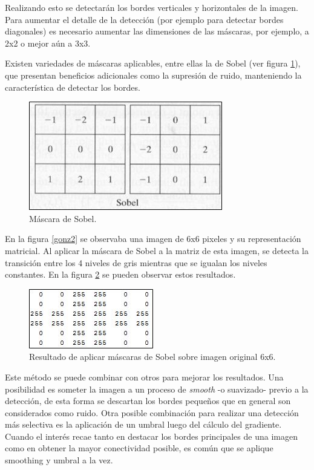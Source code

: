 Realizando esto se detectarán los bordes verticales y horizontales de la imagen. Para aumentar el detalle de la detección (por ejemplo para detectar bordes diagonales) es necesario aumentar las dimensiones de las máscaras, por ejemplo, a 2x2 o mejor aún a 3x3.

Existen variedades de máscaras aplicables, entre ellas la de Sobel (ver figura \ref{gonz5}), que presentan beneficios adicionales como la supresión de ruido, manteniendo la característica de detectar los bordes.

\begin{figure}[H]
\begin{center}
\includegraphics[scale=0.8]{img/08_matriz_sobel.jpg}
\end{center}
\caption{Máscara de Sobel.}
\label{gonz5}
\end{figure}

En la figura \ref{gonz2} se observaba una imagen de 6x6 pixeles y su representación matricial. Al aplicar la máscara de Sobel a la matriz de esta imagen, se detecta la transición entre los 4 niveles de gris mientras que se igualan los niveles constantes. En la figura \ref{gonz6} se pueden observar estos resultados.

\begin{figure}[H]
\begin{center}
\includegraphics[scale=0.8]{img/09_escala_grises_deteccion_borde.jpg}
\end{center}
\caption{Resultado de aplicar máscaras de Sobel sobre imagen original 6x6.}
\label{gonz6}
\end{figure}

 Este método se puede combinar con otros para mejorar los resultados. Una posibilidad es someter la imagen a un proceso de \textit{smooth}\cite{smooth} -o suavizado- previo a la detección, de esta forma se descartan los bordes pequeños que en general son considerados como ruido. Otra posible combinación para realizar una detección más selectiva es la aplicación de un umbral luego del cálculo del gradiente. Cuando el interés recae tanto en destacar los bordes principales de una imagen como en obtener la mayor conectividad posible, es común que se aplique smoothing y umbral a la vez.


